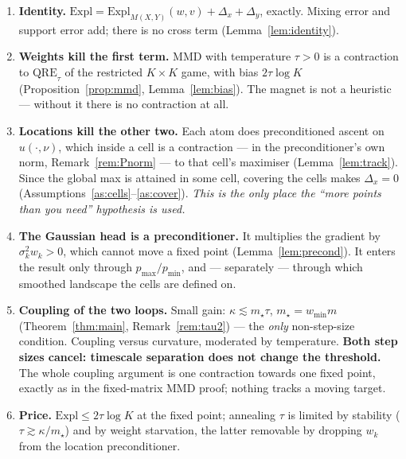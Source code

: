 \documentclass[11pt,a4paper]{article}
\theoremstyle{plain}
\theoremstyle{definition}
\theoremstyle{remark}
\newcommand{\Expl}{\mathrm{Expl}}
\newcommand{\QRE}{\mathrm{QRE}}
\begin{document}
\begin{enumerate}[leftmargin=*]
\item \textbf{Identity.} $\Expl = \Expl_{M(X,Y)}(w,v) + \Delta_x + \Delta_y$, exactly.
Mixing error and support error add; there is no cross term
(Lemma~\ref{lem:identity}).
\item \textbf{Weights kill the first term.} MMD with temperature $\tau>0$ is a
contraction to $\QRE_\tau$ of the restricted $K\times K$ game, with bias
$2\tau\log K$ (Proposition~\ref{prop:mmd}, Lemma~\ref{lem:bias}). The magnet is not
a heuristic --- without it there is no contraction at all.
\item \textbf{Locations kill the other two.} Each atom does preconditioned ascent on
$u(\cdot,\nu)$, which inside a cell is a contraction --- in the preconditioner's own
norm, Remark~\ref{rem:Pnorm} --- to that cell's maximiser (Lemma~\ref{lem:track}).
Since the global max is attained in some cell, covering the cells makes $\Delta_x=0$
(Assumptions~\ref{as:cells}--\ref{as:cover}). \emph{This is
the only place the ``more points than you need'' hypothesis is used.}
\item \textbf{The Gaussian head is a preconditioner.} It multiplies the gradient by
$\sigma_k^2w_k>0$, which cannot move a fixed point (Lemma~\ref{lem:precond}). It
enters the result only through $p_{\max}/p_{\min}$, and --- separately --- through
which smoothed landscape the cells are defined on.
\item \textbf{Coupling of the two loops.} Small gain:
$\kappa \lesssim m_\star\tau$, $m_\star=w_{\min}m$ (Theorem~\ref{thm:main},
Remark~\ref{rem:tau2}) --- the \emph{only} non-step-size condition.
Coupling versus curvature, moderated by temperature. \textbf{Both step sizes cancel:
timescale separation does not change the threshold.} The whole coupling argument is one
contraction towards one fixed point, exactly as in the fixed-matrix MMD proof; nothing
tracks a moving target.
\item \textbf{Price.} $\Expl \le 2\tau\log K$ at the fixed point; annealing $\tau$
is limited by stability ($\tau\gtrsim\kappa/m_\star$) and by weight starvation, the
latter removable by dropping $w_k$ from the location preconditioner.
\end{enumerate}
\end{document}
